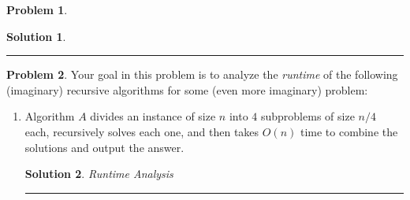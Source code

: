 \documentclass{article}
\theoremstyle{definition}
\newtheorem{problem}{Problem}
\def\fline{\rule{0.75\linewidth}{0.5pt}}
\newcommand{\finishline}{\begin{center}\fline\end{center}}
\newtheorem*{solution*}{Solution}
\newenvironment{solution}{\begin{solution*}}{{\finishline} \end{solution*}}
\begin{document}
\begin{problem}
\begin{solution}
\end{solution}



\end{problem}


\smallskip


		
\begin{problem}
	Your goal in this problem is to analyze the \emph{runtime} of the following (imaginary) recursive algorithms for some (even more imaginary) problem:
	\begin{enumerate}[label=(\Alph*)]
	
		\item Algorithm $A$ divides an instance of size $n$ into $4$ subproblems of size $n/4$ each, recursively solves each one, and then takes $O(n)$ time 
		to combine the solutions and output the answer.
		
		    \begin{solution}
			
			\emph{Runtime Analysis}
	


\end{solution}
\end{enumerate}
\end{problem}
\end{document}
